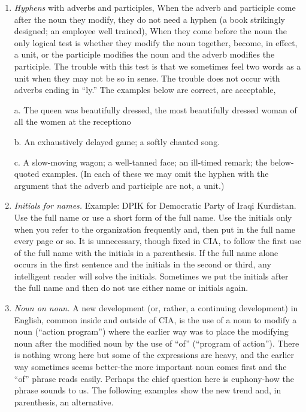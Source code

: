 \documentclass[
    oneside,
    11pt,
]{memoir}
\begin{document}
\begin{enumerate}
  (1) \enquote{Albania, as far as her relations with the USSR are concerned, will\dots.} Revised: Albania, in her relations with the USSR, will\dots. 
  
  (2) \enquote{As far as per-diem vouchers are concerned, the instruction requires that\dots.} Revised: the instruction on per-diem vouchers requires that\dots.
  
  \item \emph{Hyphens} with adverbs and participles, When the adverb and participle come after the noun they modify, they do not need a hyphen (a book strikingly designed; an employee well trained), When they come before the noun the only logical test is whether they modify the noun together, become, in effect, a unit, or the participle modifies the noun and the adverb modifies the participle. The trouble with this test is that we sometimes feel two words as a unit when they may not be so in sense. The trouble does not occur with adverbs ending in \enquote{ly.} The examples below are correct, are acceptable, 
  
  a. The queen was beautifully dressed, the most beautifully dressed woman of all the women at the receptiono 
  
  b. An exhaustively delayed game; a softly chanted song.
  
  c. A slow-moving wagon; a well-tanned face; an ill-timed remark; the below-quoted examples. (In each of these we may omit the hyphen with the argument that the adverb and participle are not, a unit.) 
  
  \item \emph{Initials for names.} Example: DPIK for Democratic Party of Iraqi Kurdistan. Use the full name or use a short form of the full name. Use the initials only when you refer to the organization frequently and, then put in the full name every page or so. It is unnecessary, though fixed in CIA, to follow the first use of the full name with the initials in a parenthesis. If the full name alone occurs in the first sentence and the initials in the second or third, any intelligent reader will solve the initials. Sometimes we put the initials after the full name and then do not use either name or initials again. 
  
  \item \emph{Noun on noun.} A new development (or, rather, a continuing development) in English, common inside and outside of CIA, is the use of a noun to modify a noun (\enquote{action program}) where the earlier way was to place the modifying noun after the modified noun by the use of \enquote{of} (\enquote{program of action}). There is nothing wrong here but some of the expressions are heavy, and the earlier way sometimes seems better-the more important noun comes first and the \enquote{of} phrase reads easily. Perhaps the chief question here is euphony-how the phrase sounds to us. The following examples show the new trend and, in parenthesis, an alternative.
  

\end{enumerate}
\end{document}

